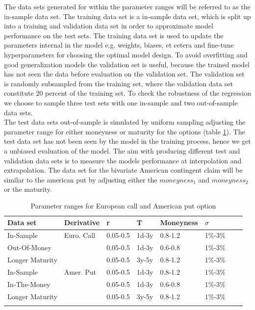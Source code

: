 The data sets generated for within the parameter ranges will be referred to as the in-sample data set. The training data set is a in-sample data set, which is split up into a training and validation data set in order to approximate model performance on the test sets. The training data set is used to update the parameters internal in the model e.g. weights, biases, et cetera and fine-tune hyperparameters for choosing the optimal model design. To avoid overfitting and good generalization models the validation set is useful, because the trained model has not seen the data before evaluation on the validation set. The validation set is randomly subsampled from the training set, where the validation data set constitute 20 percent of the training set. To check the robustness of the regression we choose to sample three test sets with one in-sample and two out-of-sample data sets. \\

The test data sets out-of-sample is simulated by uniform sampling adjusting the parameter range for either moneyness or maturity for the options (table \ref{tab:totalVanillaParRange}). The test data set has not been seen by the model in the training process, hence we get a unbiased evaluation of the model. The aim with producing different test and validation data sets is to measure the models performance at interpolation and extrapolation. The data set for the bivariate American contingent claim will be similar to the american put by adjusting either the $moneyness_1$ and $moneyness_2$ or the maturity.\\

\begin{table}[th]
\caption{Parameter ranges for European call and American put option}
\label{tab:totalVanillaParRange}
\centering
\begin{tabular}{l l l l l l l l }
\toprule
\textbf{Data set} & Derivative  & \textbf{r} & \textbf{T} & \textbf{Moneyness} & \textbf{$\sigma$} \\
\midrule
In-Sample & Euro. Call & 0.05-0.5 & 1d-3y & 0.8-1.2 & 1\%-3\%\\ 
Out-Of-Money & & 0.05-0.5 & 1d-3y & 0.6-0.8 & 1\%-3\%\\
Longer Maturity & & 0.05-0.5 & 3y-5y & 0.8-1.2 & 1\%-3\%\\
In-Sample & Amer. Put & 0.05-0.5 & 1d-3y & 0.8-1.2 & 1\%-3\%\\ 
In-The-Money & & 0.05-0.5 & 1d-3y & 0.6-0.8 & 1\%-3\%\\
Longer Maturity & & 0.05-0.5 & 3y-5y & 0.8-1.2 & 1\%-3\%\\
\bottomrule\\
\end{tabular}
\end{table}

